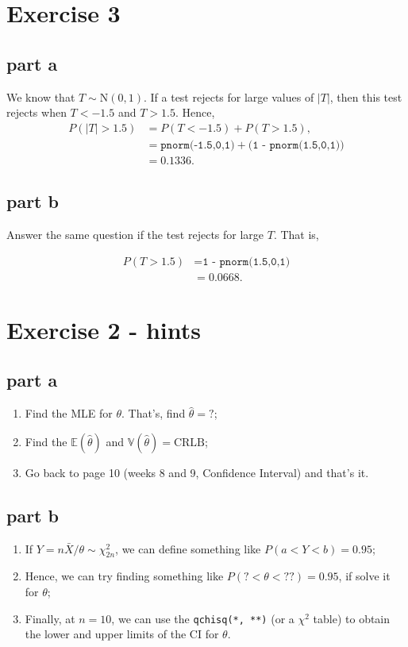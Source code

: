 \documentclass[12pt]{article}
\begin{document}
\section*{Exercise 3}
\subsection*{part a}

We know that $T \sim \mbox{N}(0,1)$. If a test rejects for large values of $|T|$, then this test rejects when $T < -1.5$ and $T > 1.5$. Hence,
\begin{align}
    P(|T| > 1.5) & = P(T < -1.5) + P(T > 1.5), \\
& = \texttt{pnorm(-1.5,0,1)} + \texttt{(1 - pnorm(1.5,0,1))} \\
& = 0.1336.
\end{align}

\subsection*{part b}
Answer the same question if the test rejects for large $T$. That is,

\begin{align}
    P(T > 1.5) & = \texttt{1 - pnorm(1.5,0,1)} \\
& = 0.0668.
\end{align}

\section*{Exercise 2 - hints}

\subsection*{part a}

\begin{enumerate}
    \item Find the MLE for $\theta$. That's, find $\hat{\theta} = ?$;
    \item Find the $\mathbb{E}(\hat{\theta})$ and $\mathbb{V}(\hat{\theta}) = \mbox{CRLB}$;
    \item Go back to page 10 (weeks 8 and 9, Confidence Interval) and that's it.
\end{enumerate}


\subsection*{part b}

\begin{enumerate}
\item If $Y = n\bar{X}/\theta \sim \chi^{2}_{2n}$, we can define something like $P(a < Y < b) = 0.95$;
\item Hence, we can try finding something like $P(? < \theta < ??) = 0.95$, if solve it for $\theta$;
\item Finally, at $n = 10$, we can use the \texttt{qchisq(*, **)} (or a $\chi^{2}$ table) to obtain the lower and upper limits of the CI for $\theta$. 
\end{enumerate}
\end{document}
